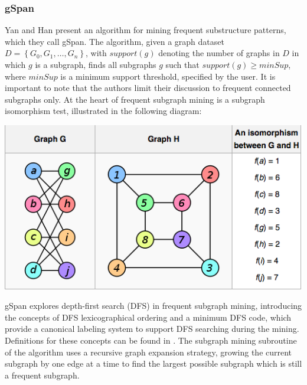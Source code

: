 \documentclass[12pt]{article}
\begin{document}
\subsubsection{gSpan}
\noindent Yan and Han present an algorithm for mining frequent substructure
patterns, which they call gSpan. The algorithm, given a graph dataset
$D = \left\{ G_0, G_1, \ldots, G_n\right\}$, with $support(g)$ denoting the
number of graphs in $D$ in which $g$ is a subgraph, finds all subgraphs $g$
such that $support(g) \geq minSup$, where $minSup$ is a minimum support
threshold, specified by the user\cite{Yan:2002:GGS:844380.844811}. It is
important to note that the authors limit their discussion to frequent
connected subgraphs only. At the heart of frequent subgraph mining is a
subgraph isomorphism test, illustrated in the following diagram:\\
\begin{center}
\includegraphics[scale=0.5]{subgraph_isomorphism.png}
\end{center}

\noindent gSpan explores depth-first search (DFS) in frequent subgraph mining,
introducing the concepts of DFS lexicographical ordering and a minimum DFS 
code, which provide a canonical labeling system to support DFS searching during
the mining. Definitions for these concepts can be found in
\cite{Yan:2002:GGS:844380.844811}. The subgraph mining subroutine of the
algorithm uses a recursive graph expansion strategy, growing the current
subgraph by one edge at a time to find the largest possible subgraph which is
still a frequent subgraph.
\end{document}
